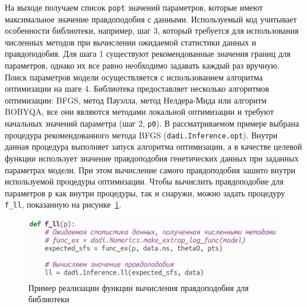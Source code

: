 \documentclass[a4paper,14pt,oneside,openany,article]{memoir}
\begin{document}
На выходе получаем список \texttt{popt} значений параметров, которые имеют максимальное значение правдоподобия с данными.
Используемый код учитывает особенности библиотеки, например, шаг 3, который требуется для использования численных методов при вычислении ожидаемой статистики данных и правдоподобия.
Для шага 1 существуют рекомендованные значения границ для параметров, однако их все равно необходимо задавать каждый раз вручную.
Поиск параметров модели осуществляется с использованием алгоритма оптимизации на шаге 4.
Библиотека предоставляет несколько алгоритмов оптимизации: BFGS, метод Пауэлла, метод Нелдера-Мида или алгоритм BOBYQA, все они являются методами локальной оптимизации и требуют начальных значений параметра (шаг 2, \texttt{p0}).
В рассматриваемом примере выбрана процедура рекомендованного метода BFGS (\texttt{dadi.Inference.opt}).
Внутри данная процедура выполняет запуск алгоритма оптимизации, а в качестве целевой функции использует значение правдоподобия генетических данных при заданных параметрах модели.
При этом вычисление самого правдоподобия зашито внутри используемой процедуры оптимизации.
Чтобы вычислить правдоподобие для параметров \texttt{p} как внутри процедуры, так и снаружи, можно задать процедуру \texttt{f\_ll}, показанную на рисунке~\ref{fig:dadi:ll_func}.
\begin{figure}[h]
    \centering
    \includegraphics[width=0.6\linewidth]{images_2/dadi_ll.png}
    \caption{Пример реализации функции вычисления правдоподобия для библиотеки \dadi}
    \label{fig:dadi:ll_func}
\end{figure}
\end{document}
